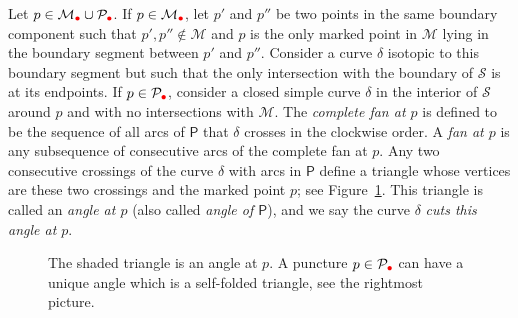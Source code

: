 \documentclass[11pt]{amsart}
\numberwithin{equation}{section}
\theoremstyle{definition}
\newcommand{\rpoint}{\color{red}{\bullet}}
\begin{document}
Let $p \in \mathcal{M}_{\rpoint}\cup\mathcal{P}_{\rpoint}$. If $p \in \mathcal{M}_{\rpoint}$, let $p'$ and $p''$ be two points in the same boundary component such that $p', p'' \not\in \mathcal{M}$ and $p$ is the only marked point in $\mathcal{M}$ lying in the boundary segment between $p'$ and $p''$. Consider a curve $\delta$ isotopic to this boundary segment but such that the only intersection with the boundary of $\mathcal{S}$ is at its endpoints. If $p \in \mathcal{P}_{\rpoint}$, consider a closed simple curve $\delta$ in the interior of $\mathcal{S}$ around $p$ and with no intersections with $\mathcal{M}$.
The {\it complete fan at $p$} is defined to be the sequence of all arcs of $\mathsf{P} $ that $\delta$ crosses in the clockwise order. A {\it fan at $p$} is any subsequence of consecutive arcs of the complete fan at $p$.
Any two consecutive crossings of the curve $\delta$ with arcs in $\mathsf{P}$ define a triangle whose vertices are these two crossings and the marked point $p$; see Figure~\ref{fig:angle}. This triangle is called an {\it angle at $p$} (also called {\it angle of $\mathsf{P} $}), and we say the curve $\delta$ {\it cuts this angle at $p$}.
\begin{figure}[htbp]
    \centering
{}
\hspace{4em}
\hspace{4em}
    \caption{The shaded triangle is an angle at $p$. A puncture $p \in \mathcal{P}_{\rpoint}$ can have a unique angle which is a self-folded triangle, see the rightmost picture.}
    \label{fig:angle}
\end{figure}
\end{document}
